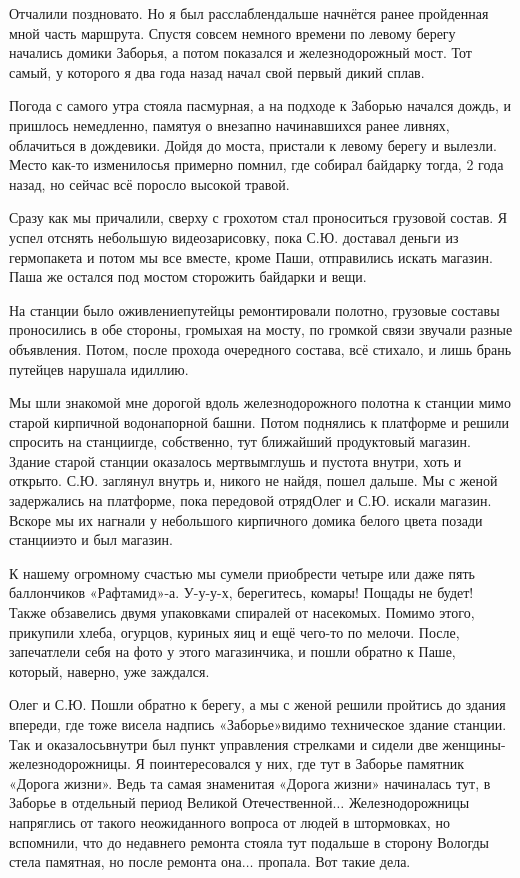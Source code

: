 Отчалили поздновато. Но я был расслаблен\mdash дальше начнётся ранее пройденная мной часть маршрута. Спустя совсем немного времени по левому берегу начались домики Заборья, а потом показался и железнодорожный мост. Тот самый, у которого я два года назад начал свой первый дикий сплав. 

Погода с самого утра стояла пасмурная, а на подходе к Заборью начался дождь, и пришлось немедленно, памятуя о внезапно начинавшихся ранее ливнях, облачиться в дождевики. Дойдя до моста, пристали к левому берегу и вылезли. Место как-то изменилось\mdash я примерно помнил, где собирал байдарку тогда, 2 года назад, но сейчас всё поросло высокой травой.

Сразу как мы причалили, сверху с грохотом стал проноситься грузовой состав. Я успел отснять небольшую видеозарисовку, пока С.Ю. доставал деньги из гермопакета и потом мы все вместе, кроме Паши, отправились искать магазин. Паша же остался под мостом сторожить байдарки и вещи. 

На станции было оживление\mdash путейцы ремонтировали полотно, грузовые составы проносились в обе стороны, громыхая на мосту, по громкой связи звучали разные объявления. Потом, после прохода очередного состава, всё стихало, и лишь брань путейцев нарушала идиллию. 

Мы шли знакомой мне дорогой вдоль железнодорожного полотна к станции мимо старой кирпичной водонапорной башни. Потом поднялись к платформе и решили спросить на станции\mdash где, собственно, тут ближайший продуктовый магазин. Здание старой станции оказалось мертвым\mdash глушь и пустота внутри, хоть и открыто. С.Ю. заглянул внутрь и, никого не найдя, пошел дальше. Мы с женой задержались на платформе, пока передовой отряд\mdash Олег и С.Ю. искали магазин. Вскоре мы их нагнали у небольшого кирпичного домика белого цвета позади станции\mdash это и был магазин. 

К нашему огромному счастью мы сумели приобрести четыре или даже пять баллончиков «Рафтамид»-а. У-у-у-х, берегитесь, комары! Пощады не будет! Также обзавелись двумя упаковками спиралей от насекомых. Помимо этого, прикупили хлеба, огурцов, куриных яиц и ещё чего-то по мелочи. После, запечатлели себя на фото у этого магазинчика, и пошли обратно к Паше, который, наверно, уже заждался.

Олег и С.Ю. Пошли обратно к берегу, а мы с женой решили пройтись до здания впереди, где тоже висела надпись «Заборье»\mdash видимо техническое здание станции. Так и оказалось\mdash внутри был пункт управления стрелками и сидели две женщины-железнодорожницы. Я поинтересовался у них, где тут в Заборье памятник «Дорога жизни». Ведь та самая знаменитая «Дорога жизни» начиналась тут, в Заборье в отдельный период Великой Отечественной$\ldots$ Железнодорожницы напряглись от такого неожиданного вопроса от людей в штормовках, но вспомнили, что до недавнего ремонта стояла тут подальше в сторону Вологды стела памятная, но после ремонта она$\ldots$ пропала. Вот такие дела.

